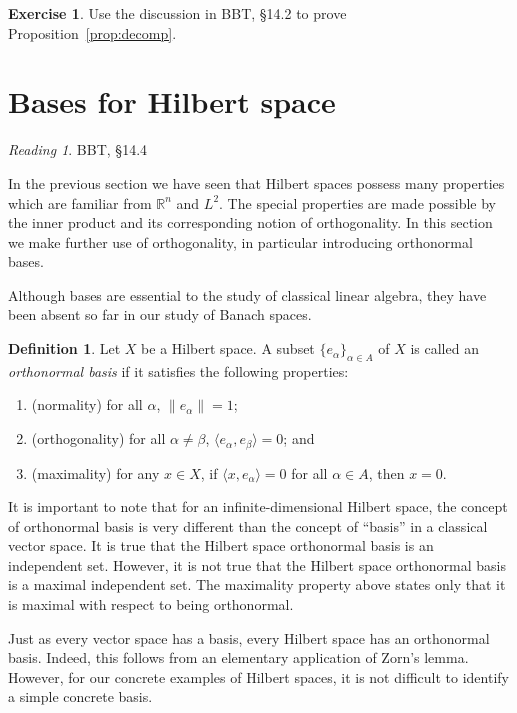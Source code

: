 \documentclass[11pt,oneside]{amsbook}
\newcommand{\RR}{{\mathbb R}}
\theoremstyle{definition}
\newtheorem{exerc}{Exercise}[section]
\theoremstyle{plain}
\theoremstyle{definition}
\newtheorem{defn}[thm]{Definition}
\theoremstyle{remark}
\newtheorem*{reading}{Reading}
\numberwithin{equation}{section}
\numberwithin{figure}{section}
\begin{document}
\begin{exerc}
  Use the discussion in BBT, \S 14.2 to prove Proposition~\ref{prop:decomp}.
\end{exerc}

\newpage
\section{Bases for Hilbert space}

\begin{reading}
  BBT, \S 14.4
\end{reading}

In the previous section we have seen that Hilbert spaces possess many properties which are familiar from $\RR^n$ and $L^2$. The special properties are made possible by the inner product and its corresponding notion of orthogonality. In this section we make further use of orthogonality, in particular introducing orthonormal bases.

Although bases are essential to the study of classical linear algebra, they have been absent so far in our study of Banach spaces.

\begin{defn}
  Let $X$ be a Hilbert space. A subset $\{e_\alpha\}_{\alpha\in A}$ of $X$ is called an \emph{orthonormal basis} if it satisfies the following properties:
  \begin{enumerate}
  \item (normality) for all $\alpha$, $\|e_\alpha\|=1$;
  \item (orthogonality) for all $\alpha\neq\beta$, $\langle e_\alpha,e_\beta\rangle=0$; and
  \item (maximality) for any $x\in X$, if $\langle x,e_\alpha\rangle=0$ for all $\alpha\in A$, then $x=0$.
  \end{enumerate}
\end{defn}

It is important to note that for an infinite-dimensional Hilbert space, the concept of orthonormal basis is very different than the concept of ``basis'' in a classical vector space. It is true that the Hilbert space orthonormal basis is an independent set. However, it is not true that the Hilbert space orthonormal basis is a maximal independent set. The maximality property above states only that it is maximal with respect to being orthonormal.

Just as every vector space has a basis, every Hilbert space has an orthonormal basis. Indeed, this follows from an elementary application of Zorn's lemma. However, for our concrete examples of Hilbert spaces, it is not difficult to identify a simple concrete basis.
\end{document}
